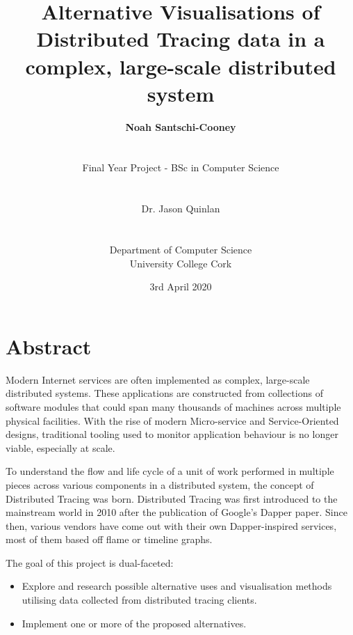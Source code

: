 \documentclass[12pt,pdftex,titlepage]{report}
\author{\textbf{Noah Santschi-Cooney}
\\\\\\\small{Final Year Project - BSc in Computer Science}
\\\\\\\small{Dr. Jason Quinlan}
\\\\\\\small{Department of Computer Science}
\\\small{University College Cork}}
\title{\textbf{Alternative Visualisations of Distributed Tracing data in a complex, large-scale distributed system}}
\date{\vfill\small{3rd April 2020}}
\begin{document}
    \maketitle    

    \chapter*{Abstract}
        \begin{spacing}{1.0}
            Modern Internet services are often implemented as complex, large-scale distributed systems. These applications are constructed from collections 
            of software modules that could span many thousands of machines across multiple physical facilities. With the rise of modern Micro-service and 
            Service-Oriented designs, traditional tooling used to monitor application behaviour is no longer viable, especially at scale. 
            
            To understand the flow and life cycle of a unit of work performed in multiple pieces across various components in a distributed system, the concept of 
            Distributed Tracing was born. Distributed Tracing was first introduced to the mainstream world in 2010 after the publication of Google’s Dapper
            paper. Since then, various vendors have come out with their own Dapper-inspired services, most of them based off flame or timeline graphs. 
            
            The goal of this project is dual-faceted:
            \begin{itemize}
                \item Explore and research possible alternative uses and visualisation methods utilising data collected from distributed tracing clients.
                \item Implement one or more of the proposed alternatives.
            \end{itemize}
        \end{spacing}
\end{document}
